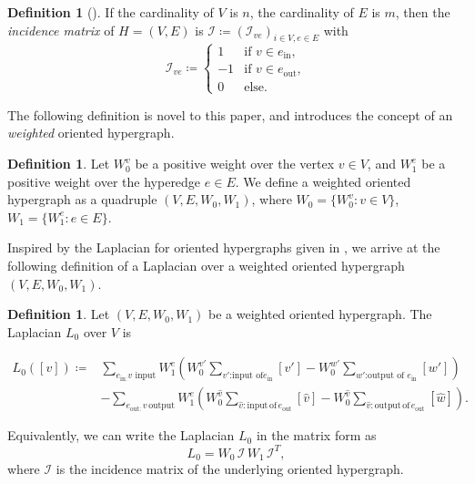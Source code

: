 \documentclass{article}
\theoremstyle{definition}
\newtheorem{definition}[theorem]{Definition}
\begin{document}
\begin{definition}[\cite{MR4236395}]
 If the cardinality of $V$ is $n$,
 the cardinality of $E$ is $m$,
then the \emph{incidence matrix} of $H=(V, E)$ is $\mathcal{I}\coloneqq (\mathcal{I}_{ve})_{i\in V, e\in E}$ with 
 \[
 \mathcal{I}_{ve}
 \coloneqq
 \begin{cases}
1 & \textrm{if } v\in e_{\mathrm{in}},\\
-1 & \textrm{if } v\in e_{\mathrm{out}},\\
0 & \textrm{else}.
 \end{cases}
 \]
\end{definition}

The following definition is novel to this paper, and introduces the concept of an \emph{weighted} oriented hypergraph. 

\begin{definition}
Let $W_0^v$ be a positive weight over the vertex $v\in V$,
and $W_1^e$ be a positive weight over the hyperedge $e\in E$.
We define a weighted oriented hypergraph as a 
quadruple $(V, E, W_0, W_1)$,
where $W_0=\{W_0^v: v\in V\}$,
$W_1=\{W_1^e: e\in E\}$.
\end{definition}

Inspired by the Laplacian for oriented hypergraphs given in \cite{MR4236395}, we arrive at the following definition of a Laplacian over a weighted oriented hypergraph $(V, E, W_0, W_1)$.

\begin{definition}
\label{def:laphyper}
Let $(V, E, W_0, W_1)$ be a weighted oriented hypergraph.
The Laplacian $L_0$ over $V$ is 

\[
\begin{aligned}
L_0([v])
\coloneqq
&\sum_{e_{\textrm{in}:} v \textrm{ input}} W^e_1 \left(W_0^{v'} \sum_{v' \textrm{:input of} e_{\mathrm{in}}} [v']  
-
W_{0}^{w'}\sum_{w'\textrm{:output of } e_{\textrm{in}}}[w']
\right)\\
&-
\sum_{e_{\mathrm{out}:} v\, \mathrm{output}} W_{1}^e \left( W_{0}^{\hat{v}}\sum_{\hat{v}\mathrm{: input \, of \,} e_{\mathrm{out}}}[\hat{v}] 
-
W_0^{\hat{v}}\sum_{\hat{v}\mathrm{: output \, of \,} e_{\mathrm{out}}}[\hat{w}]
\right).
\end{aligned}
\]

Equivalently,
we can write the Laplacian $L_0$ in the matrix form as
\[
L_0
=
W_0\, \mathcal{I}\, W_1\, \mathcal{I}^T,
\]
where $\mathcal{I}$ is the incidence matrix of the underlying oriented hypergraph.
\end{definition}
\end{document}
